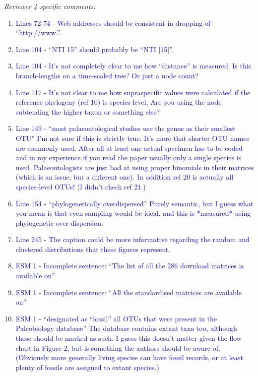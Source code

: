 \documentclass[12pt,letterpaper]{article}
\renewcommand{\subsection}[1]{%
\bigskip
\begin{center}
\begin{large}
\normalfont\itshape #1
\end{large}
\end{center}}
\begin{document}
\subsection{Reviewer 4 specific comments:}
\begin{enumerate}
\item{\textcolor{blue}{Lines 72-74 - Web addresses should be consistent in dropping of ``http://www.''.}}
\item{\textcolor{blue}{Line 104 - ``NTI 15'' should probably be ``NTI [15]''.}}
\item{\textcolor{blue}{Line 104 - It’s not completely clear to me how ``distance'' is measured. Is this branch-lengths on a time-scaled tree? Or just a node count?}}
\item{\textcolor{blue}{Line 117 - It’s not clear to me how supraspecific values were calculated if the reference phylogeny (ref 10) is species-level. Are you using the node subtending the higher taxon or something else?}}
\item{\textcolor{blue}{Line 149 - ``most palaeontological studies use the genus as their smallest OTU'' I’m not sure if this is strictly true. It’s more that shorter OTU names are commonly used. After all at least one actual specimen has to be coded and in my experience if you read the paper usually only a single species is used. Palaeontologists are just bad at using proper binomials in their matrices (which is an issue, but a different one). In addition ref 20 is actually all species-level OTUs! (I didn’t check ref 21.)}}
\item{\textcolor{blue}{Line 154 - ``phylogenetically overdispersed'' Purely semantic, but I guess what you mean is that even sampling would be ideal, and this is *measured* using phylogenetic over-dispersion.}}
\item{\textcolor{blue}{Line 245 - The caption could be more informative regarding the random and clustered distributions that these figures represent.}}
\item{\textcolor{blue}{ESM 1 - Incomplete sentence: ``The list of all the 286 download matrices is available on''}}
\item{\textcolor{blue}{ESM 1 - Incomplete sentence: ``All the standardised matrices are available on''}}
\item{\textcolor{blue}{ESM 1 - ``designated as ``fossil'' all OTUs that were present in the Paleobiology database'' The database contains extant taxa too, although these should be marked as such. I guess this doesn’t matter given the flow chart in Figure 2, but is something the authors should be aware of. (Obviously more generally living species can have fossil records, or at least plenty of fossils are assigned to extant species.)}}

\end{enumerate}
\end{document}
